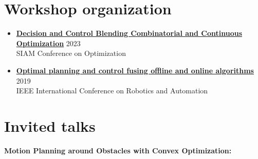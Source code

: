 \documentclass[11pt,a4paper,sans]{moderncv}
\begin{document}
%

\section{Workshop organization}

\vspace{5pt}

\begin{itemize}

\item\href{https://meetings.siam.org/sess/dsp_programsess.cfm?SESSIONCODE=76788}{\color{cyan}\textbf{Decision and Control Blending Combinatorial and Continuous Optimization}} \hfill 2023 \\
SIAM Conference on Optimization

\item\href{https://sites.google.com/mit.edu/icra19ws}{\color{cyan}\textbf{Optimal planning and control fusing offline and online algorithms}} \hfill 2019 \\
IEEE International Conference on Robotics and Automation

\end{itemize}


\section{Invited talks}

\vspace{5pt}

\textbf{Motion Planning around Obstacles with Convex Optimization:}

\vspace{5pt}
\end{document}
